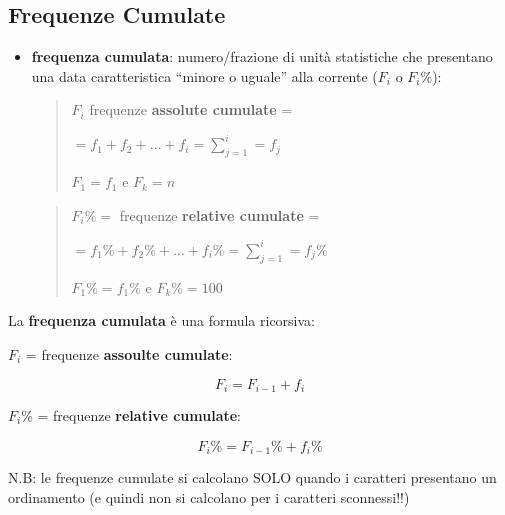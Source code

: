 \documentclass[compress]{beamer}
\begin{document}
\subsection*{Frequenze Cumulate}
\begin{frame}
	\begin{itemize}
			\item \textbf{frequenza cumulata}: numero/frazione di
		unità statistiche che presentano una data caratteristica
		``minore o uguale'' alla corrente ($F_i$ o $F_i\%$): 
		
		\vspace{3mm}
		\begin{quote}
			$F_i$ frequenze \textbf{assolute cumulate} =
			
						\vspace{3mm}
			\centering
			
			$= f_1 + f_2 + \ldots + f_i = \sum_{j=1}^{i} = f_j$
			
			\vspace{3mm}
			$F_1 = f_1$ e $F_k = n$
		\end{quote}
		
		\begin{quote}
			$F_i\% = $ frequenze \textbf{relative cumulate} = 
			
						\vspace{3mm}
			\centering
			
			$= f_1\% + f_2\% + \ldots + f_i\% = \sum_{j=1}^{i} = f_j\%$
			
			\vspace{3mm}
			$F_1\% = f_1\%$ e $F_k\% = 100$
			
		\end{quote}
		
	\end{itemize}
\end{frame}

\begin{frame}
	La \textbf{frequenza cumulata} è una formula ricorsiva: 


\begin{block}{}
	
$F_i$ = frequenze \textbf{assoulte cumulate}: 

\begin{equation*}
	F_i = F_{i-1} + f_i
\end{equation*}


	
$F_i\%$ = frequenze \textbf{relative cumulate}: 

\begin{equation*}
	F_i\% = F_{i-1}\% + f_i\%
\end{equation*}
\end{block}




\begin{block}
	
N.B: le frequenze cumulate si calcolano SOLO quando i caratteri presentano un ordinamento (e quindi non si calcolano per i caratteri sconnessi!!)
\end{block}
\end{frame}
\end{document}

